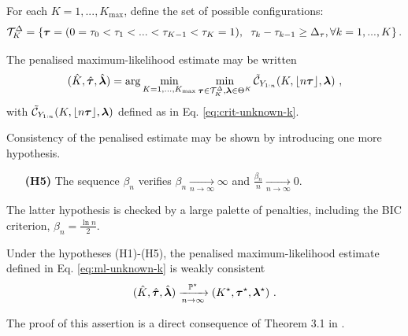 For each $K=1,..., K_{\max}$, define the set of possible configurations:
\begin{equation}\label{eq:vector-tau}
  {\mathcal T}_{K}^{\Delta} = \left\{  \bm \tau = (0=\tau_{0}<\tau_{1}< ...<\tau_{K-1}<\tau_{K}=1),  \right. \\
 \left. \tau_{k}-\tau_{k-1}\ge \Delta_{\tau}, \forall k=1,...,K \right\} . 
\end{equation}

The penalised maximum-likelihood estimate may be written 
\begin{equation}\label{eq:ml-unknown-k}
 (\hat K, \hat{\bm \tau}, \hat{\bm \lambda})  = \arg\min_{K=1,...,K_{\max}} \min_{\bm \tau\in  {\mathcal T}_{K}^{\Delta} , \bm \lambda\in \Theta^{K}}   \tilde {{\mathcal C}}_{Y_{1:n}}(K, \lfloor n\bm \tau \rfloor, \bm \lambda )  \ , 
\end{equation}
with $\tilde {{\mathcal C}}_{Y_{1:n}}(K, \lfloor n\bm \tau \rfloor, \bm \lambda )$ defined as in Eq. \ref{eq:crit-unknown-k}. 

Consistency of the penalised estimate may be shown by introducing one more hypothesis. 
\begin{itemize}
\item[\textbf{(H5)}] The sequence $\beta_{n}$ verifies $\beta_{n}\xrightarrow[n\rightarrow \infty]{} \infty$ and $\frac{\beta_{n}}{n}\xrightarrow[n\rightarrow \infty]{} 0$.
\end{itemize}

The latter hypothesis is checked by a large palette of penalties, including the BIC criterion, $\beta_{n}=\frac{\ln n}{2}$. 

\begin{proposition}
Under the hypotheses (H1)-(H5), the penalised maximum-likelihood estimate defined in Eq. \ref{eq:ml-unknown-k} is weakly consistent
\begin{equation}\label{eq:ml-convergence-pen}
  (\hat K, \hat{\bm \tau}, \hat{\bm \lambda}) \xrightarrow[n\rightarrow \infty]{{\mathbb P}^{\star}}   (K^{\star}, \bm \tau^{\star}, \bm \lambda^{\star}) \ .
\end{equation}
\end{proposition}

The proof of this assertion is a direct consequence of Theorem 3.1 in \cite{Lavielle1997}. 


